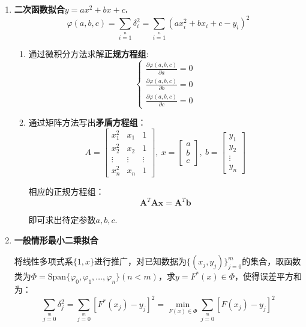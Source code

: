 \begin{enumerate}
\item \textbf{二次函数拟合$y=ax^2 + bx + c$.}
	\begin{equation}
	\varphi(a,b,c) =  \sum\limits_{i=1}\limits^{n}\delta_i^2 = \sum\limits_{i=1}\limits^{n}(ax_i^2+bx_i+c-y_i)^2
	\end{equation}
	\begin{enumerate}
		\item 通过微积分方法求解\textbf{正规方程组}:
		\begin{equation}
			\begin{cases}
			{\displaystyle \frac{\partial \varphi(a,b,c)}{\partial a} = 0} \\[3mm]
			{\displaystyle \frac{\partial \varphi(a,b,c)}{\partial b} = 0} \\[3mm]
			{\displaystyle \frac{\partial \varphi(a,b,c)}{\partial c} = 0}
			\end{cases}
		\end{equation}
	
		\item 通过矩阵方法写出\textbf{矛盾方程组}：
		$$
		A = \begin{bmatrix}	x_1^2 &x_1 &1\\ x_2^2 &x_2 &1 \\ \vdots &\vdots & \vdots\\ x_n^2 &x_n &1 \end{bmatrix},\ 
		x = \begin{bmatrix} a \\ b \\c \end{bmatrix},\ 
		b = \begin{bmatrix}	y_1 \\ y_2 \\ \vdots \\ y_n \end{bmatrix}
		$$
	
		相应的正规方程组：
		$$
		\boldsymbol{A}^T\boldsymbol{Ax} = \boldsymbol{A}^T\boldsymbol{b}
		$$
	
		即可求出待定参数$a,b,c$.
	\end{enumerate}

\item \textbf{一般情形最小二乘拟合}
	
	将线性多项式系$\{1,x\}$进行推广，对已知数据为$\{(x_j,y_j)\}_{j=0}^m$的集合，取函数类为$\varPhi = \text{Span}\{\varphi_0,\varphi_1,\dots,\varphi_n \}(n<m)$，求$y=F^*(x)\in \varPhi$，使得误差平方和为：
	\begin{equation}
	\sum\limits_{j=0}\limits^m\delta_j^2 = \sum\limits_{j=0}\limits^m [F^*(x_j) - y_j]^2 = \min\limits_{F(x)\in \varPhi}\sum\limits_{j=0}\limits^m [F(x_j) - y_j]^2
	\end{equation}
	

\end{enumerate}

